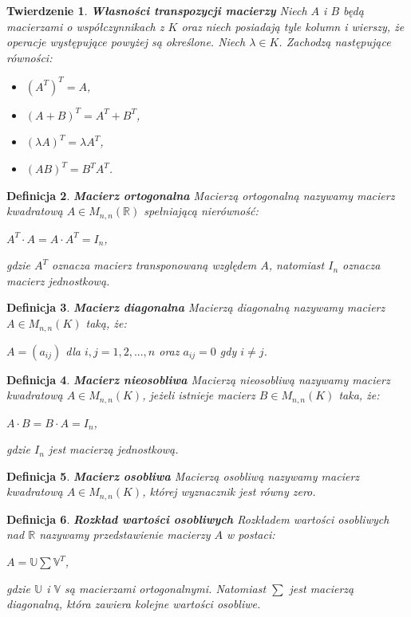 \documentclass[12pt,a4paper]{report}
\newtheorem{df}{Definicja}[chapter]
\newtheorem{tw}[df]{Twierdzenie}
\begin{document}
\begin{tw}\textbf{Własności transpozycji macierzy}
Niech $A$ i $B$ będą macierzami o współczynnikach z $K$ oraz niech posiadają tyle kolumn i wierszy, że operacje występujące powyżej są określone. Niech $\lambda \in K$.
Zachodzą następujące równości:
\begin{itemize}
\item $(A^T)^T = A$,
\item $(A + B)^T = A^T + B^T$,
\item $(\lambda A)^T = \lambda A^T$,
\item $(AB)^T = B^T A^T$.
\end{itemize}
\end{tw}
\begin{df}\textbf{Macierz ortogonalna}
Macierzą ortogonalną nazywamy macierz kwadratową $A \in M_{n,n}(\mathbb{R})$ spełniającą nierówność:
\begin{center}
$A^T \cdot A = A\cdot A^T = I_n$,
\end{center}
gdzie $A^T$ oznacza macierz transponowaną względem $A$, natomiast $I_n$ oznacza macierz jednostkową.
\end{df}

\begin{df}\textbf{Macierz diagonalna}
Macierzą diagonalną nazywamy macierz $A\in M_{n,n}(K)$ taką, że:
\begin{center}
$A = (a_{ij})$ dla $i,j=1,2,...,n$ 
oraz 
$a_{ij} = 0$ gdy $i\neq j$.
\end{center}
\end{df}

\begin{df}\textbf{Macierz nieosobliwa}
Macierzą nieosobliwą nazywamy macierz kwadratową $A \in M_{n,n}(K)$, jeżeli istnieje macierz $B \in M_{n,n}(K)$ taka, że:
\begin{center}
$A \cdot B = B \cdot A = I_n$,
\end{center}
gdzie $I_n$ jest macierzą jednostkową.
\end{df}
\begin{df}\textbf{Macierz osobliwa}
Macierzą osobliwą nazywamy macierz kwadratową $A \in M_{n,n}(K)$, której wyznacznik jest równy zero.
\end{df}
\begin{df}\textbf{Rozkład wartości osobliwych}
Rozkładem wartości osobliwych nad $\mathbb{R}$ nazywamy przedstawienie macierzy $A$ w postaci:
\begin{center}
$A = \mathbb{U}\sum \mathbb{V}^T$,
\end{center}
gdzie $\mathbb{U}$ i $\mathbb{V}$ są macierzami ortogonalnymi. Natomiast $\sum$ jest macierzą diagonalną, która zawiera kolejne wartości osobliwe.
\end{df}
\end{document}
